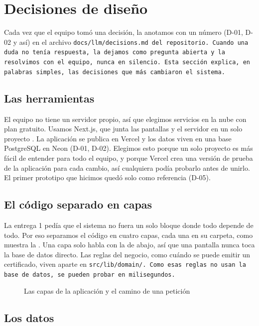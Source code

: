 \FloatBarrier
\section{Decisiones de diseño}\label{sec:diseno}

Cada vez que el equipo tomó una decisión, la anotamos con un número (D-01, D-02 y así) en el archivo \tt{docs/llm/decisions.md} del repositorio. Cuando una duda no tenía respuesta, la dejamos como pregunta abierta y la resolvimos con el equipo, nunca en silencio. Esta sección explica, en palabras simples, las decisiones que más cambiaron el sistema.

\subsection{Las herramientas}\label{sec:pila}

El equipo no tiene un servidor propio, así que elegimos servicios en la nube con plan gratuito. Usamos Next.js, que junta las pantallas y el servidor en un solo proyecto \parencite{nextjs}. La aplicación se publica en Vercel y los datos viven en una base PostgreSQL en Neon (D-01, D-02). Elegimos esto porque un solo proyecto es más fácil de entender para todo el equipo, y porque Vercel crea una versión de prueba de la aplicación para cada cambio, así cualquiera podía probarlo antes de unirlo. El primer prototipo que hicimos quedó solo como referencia (D-05).

\subsection{El código separado en capas}\label{sec:capas}

La entrega 1 pedía que el sistema no fuera un solo bloque donde todo depende de todo. Por eso separamos el código en cuatro capas, cada una en su carpeta, como muestra la . Una capa solo habla con la de abajo, así que una pantalla nunca toca la base de datos directo. Las reglas del negocio, como cuándo se puede emitir un certificado, viven aparte en \tt{src/lib/domain/}. Como esas reglas no usan la base de datos, se pueden probar en milisegundos.

\begin{figure}[H]
  \centering
  
  \caption{Las capas de la aplicación y el camino de una petición}\label{fig:capas}
\end{figure}

\subsection{Los datos}\label{sec:datos}

